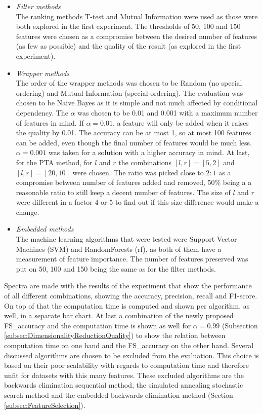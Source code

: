 \documentclass[10pt,a4paper]{article}
\begin{document}
	\begin{itemize}
		\item \textit{Filter methods} \\
		The ranking methods T-test and Mutual Information were used as those were both explored in the first experiment. The thresholds of 50, 100 and 150 features were chosen as a compromise between the desired number of features (as few as possible) and the quality of the result (as explored in the first experiment).
		\item \textit{Wrapper methods} \\
		The order of the wrapper methods was chosen to be Random (no special ordering) and Mutual Information (special ordering). The evaluation was chosen to be Naive Bayes as it is simple and not much affected by conditional dependency. The $\alpha$ was chosen to be 0.01 and 0.001 with a maximum number of features in mind. If $\alpha= 0.01$, a feature will only be added when it raises the quality by 0.01. The accuracy can be at most 1, so at most 100 features can be added, even though the final number of features would be much less. $\alpha = 0.001$ was taken for a solution with a higher accuracy in mind. At last, for the PTA method, for $l$ and $r$ the combinations $[l, r] = [5, 2]$ and $[l, r] = [20, 10]$ were chosen. The ratio was picked close to $2:1$ as a compromise between number of features added and removed, 50\% being a a reasonable ratio to still keep a decent number of features. The size of $l$ and $r$ were different in a factor $4$ or $5$ to find out if this size difference would make a change.
		\item \textit{Embedded methods} \\
		The machine learning algorithms that were tested were Support Vector Machines (SVM) and RandomForests (rf), as both of them have a measurement of feature importance. The number of features preserved was put on 50, 100 and 150 being the same as for the filter methods.
		
		
	\end{itemize}
	 Spectra are made with the results of the experiment that show the performance of all different combinations, showing the accuracy, precision, recall and F1-score. On top of that the computation time is computed and shown per algorithm, as well, in a separate bar chart. At last a combination of the newly proposed FS\_accuracy and the computation time is shown as well for $\alpha = 0.99$ (Subsection \ref{subsec:DimensionalityReductionQuality}) to show the relation between computation time on one hand and the FS\_accuracy on the other hand. 
	Several discussed algorithms  are chosen to be excluded from the evaluation. This choice is based on their poor scalability with regards to computation time and therefore unfit for datasets with this many features. These excluded algorithms are the backwards elimination sequential method, the simulated annealing stochastic search method and the embedded backwards elimination method (Section \ref{subsec:FeatureSelection}). 
\end{document}
